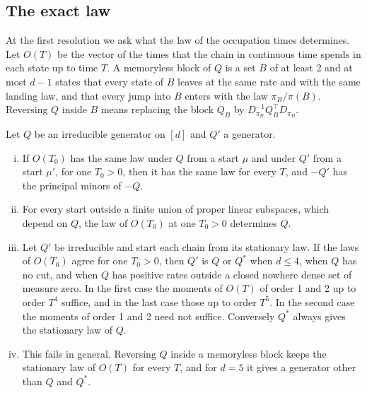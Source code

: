 \subsection{The exact law}\label{sec:intro-law}

At the first resolution we ask what the law of the occupation times determines. Let $O(T)$ be the
vector of the times that the chain in continuous time spends in each state up to time $T$. A
memoryless block of $Q$ is a set $B$ of at least 2 and at most $d-1$ states that every state of
$B$ leaves at the same rate and with the same landing law, and that every jump into $B$ enters
with the law $\pi_B/\pi(B)$. Reversing $Q$ inside $B$ means replacing the block $Q_B$ by
$D_{\pi_B}^{-1}Q_B^\top D_{\pi_B}$.

\begin{introtheorem}\label{thm:law}
Let $Q$ be an irreducible generator on $[d]$ and $Q'$ a generator.
\begin{enumerate}[(i)]
\item If $O(T_0)$ has the same law under $Q$ from a start $\mu$ and under $Q'$ from a start
$\mu'$, for one $T_0>0$, then it has the same law for every $T$, and $-Q'$ has the principal
minors of $-Q$.
\item For every start outside a finite union of proper linear subspaces, which depend on $Q$, the
law of $O(T_0)$ at one $T_0>0$ determines $Q$.
\item Let $Q'$ be irreducible and start each chain from its stationary law. If the laws of
$O(T_0)$ agree for one $T_0>0$, then $Q'$ is $Q$ or $Q^*$ when $d\le4$, when $Q$ has no cut, and
when $Q$ has positive rates outside a closed nowhere dense set of measure zero. In the first case
the moments of $O(T)$ of order 1 and 2 up to order $T^4$ suffice, and in the last case those up to
order $T^5$. In the second case the moments of order 1 and 2 need not suffice. Conversely $Q^*$
always gives the stationary law of $Q$.
\item This fails in general. Reversing $Q$ inside a memoryless block keeps the stationary law of
$O(T)$ for every $T$, and for $d=5$ it gives a generator other than $Q$ and $Q^*$.
\end{enumerate}
\end{introtheorem}

